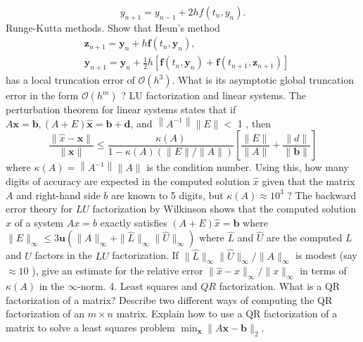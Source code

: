 \documentclass[14pt]{extarticle}
\begin{document}
$$
y_{n+1}=y_{n-1}+2 h f\left(t_{n}, y_{n}\right) .
$$
\newpage
Runge-Kutta methods. Show that Heun's method
$$
\begin{aligned}
&\mathbf{z}_{n+1}=\mathbf{y}_{n}+h \mathbf{f}\left(t_{n}, \mathbf{y}_{n}\right), \\
&\mathbf{y}_{n+1}=\mathbf{y}_{n}+\frac{1}{2} h\left[\mathbf{f}\left(t_{n}, \mathbf{y}_{n}\right)+\mathbf{f}\left(t_{n+1}, \mathbf{z}_{n+1}\right)\right]
\end{aligned}
$$
has a local truncation error of $\mathcal{O}\left(h^{3}\right)$. What is its asymptotic global truncation error in the form $\mathcal{O}\left(h^{m}\right)$ ?
\newpage
LU factorization and linear systems. The perturbation theorem for linear systems states that if $A \boldsymbol{x}=\boldsymbol{b},(A+E) \widehat{\boldsymbol{x}}=\boldsymbol{b}+\boldsymbol{d}$, and $\left\|A^{-1}\right\|\|E\|<$ 1 , then
$$
\frac{\|\hat{x}-\boldsymbol{x}\|}{\|\boldsymbol{x}\|} \leq \frac{\kappa(A)}{1-\kappa(A)(\|E\| /\|A\|)}\left[\frac{\|E\|}{\|A\|}+\frac{\|d\|}{\|\boldsymbol{b}\|}\right]
$$
where $\kappa(A)=\left\|A^{-1}\right\|\|A\|$ is the condition number. Using this, how many digits of accuracy are expected in the computed solution $\widehat{x}$ given that the matrix $A$ and right-hand side $b$ are known to 5 digits, but $\kappa(A) \approx 10^{3}$ ? The backward error theory for $L U$ factorization by Wilkinson shows that the computed solution $\hat{x}$ of a system $A x=b$ exactly satisfies $(A+E) \widehat{x}=\boldsymbol{b}$ where $\|E\|_{\infty} \leq 3 \mathbf{u}\left(\|A\|_{\infty}+\|\widehat{L}\|_{\infty}\|\widehat{U}\|_{\infty}\right)$ where $\widehat{L}$ and $\widehat{U}$ are the computed $L$ and $U$ factors in the $L U$ factorization. If $\|\widehat{L}\|_{\infty}\|\widehat{U}\|_{\infty} /\|A\|_{\infty}$ is modest (say $\approx 10$ ), give an estimate for the relative error $\|\widehat{x}-x\|_{\infty} /\|x\|_{\infty}$ in terms of $\kappa(A)$ in the $\infty$-norm. 4. Least squares and $Q R$ factorization. What is a QR factorization of a matrix? Describe two different ways of computing the QR factorization of an $m \times n$ matrix. Explain how to use a QR factorization of a matrix to solve a least squares problem $\min _{\mathbf{x}}\|A \mathbf{x}-\mathbf{b}\|_{2}$.
\end{document}

